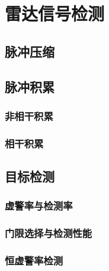 \chapter{雷达信号检测}

\section{脉冲压缩}

\section{脉冲积累}
\subsection{非相干积累}
\subsection{相干积累}

\section{目标检测}
\subsection{虚警率与检测率}
\subsection{门限选择与检测性能}
\subsection{恒虚警率检测}



